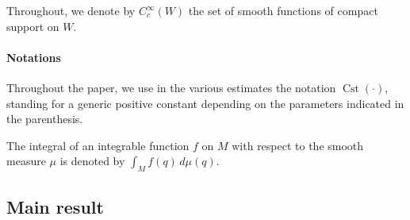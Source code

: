 \documentclass[AHL,Unicode,published]{cedram}
\DeclareMathOperator{\Cst}{Cst}
\begin{document}
Throughout, we denote by $C_c^\infty(W)$ the set of smooth functions of compact support on $W$.

\goodbreak
\paragraph{Notations}
Throughout the paper, we use in the various estimates the notation $\Cst(\cdot)$, standing for a generic positive constant depending on the parameters indicated in the parenthesis.

The integral of an integrable function $f$ on $M$ with respect to the smooth measure $\mu$ is denoted by $\int_M f(q)\, d\mu(q)$.


\subsection{Main result}
\end{document}
